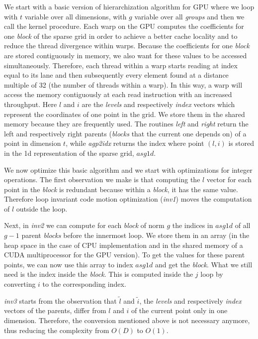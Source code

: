 We start with a basic version of hierarchization algorithm for GPU where we loop
with $t$ variable over all dimensions, with $g$ variable over all \textit{groups}
and then we call the kernel procedure. Each warp on the GPU computes the
coefficients for one \textit{block} of the sparse grid in order to achieve a
better cache locality and to reduce the thread divergence within warps. Because
the coefficients for one \textit{block} are stored contiguously in memory, we
also want for these values to be accessed simultaneously. Therefore, each thread
within a warp starts reading at index equal to its lane and then subsequently
every element found at a distance multiple of 32 (the number of threads within a
warp). In this way, a warp will access the memory contiguously at each read
instruction with an increased throughput. Here $l$ and $i$ are the
\textit{levels} and respectively \textit{index} vectors which represent the
coordinates of one point in the grid. We store them in the shared memory because
they are frequently used. The routines \textit{left} and \textit{right} return
the left and respectively right parents (\textit{blocks} that the current one
depends on) of a point in dimension $t$, while \textit{agp2idx} returns the
index where point $(l, i)$ is stored in the 1d representation of the sparse
grid, $asg1d$.

We now optimize this basic algorithm and we start with optimizations for integer
operations. The first observation we make is that computing the $l$ vector for
each point in the \textit{block} is redundant because within a \textit{block},
it has the same value. Therefore loop invariant code motion optimization
(\textit{inv1}) moves the computation of $l$ outside the loop. 

Next, in \textit{inv2} we can compute for each \textit{block} of norm $g$ the
indices in $asg1d$ of all $g-1$ parent \textit{blocks} before the innermost
loop. We store them in an array (in the heap space in the case of CPU
implementation and in the shared memory of a CUDA multiprocessor for the GPU
version). To get the values for these parent points, we can now use this array
to index $asg1d$ and get the \textit{block}. What we still need is the index
inside the \textit{block}. This is computed inside the $j$ loop by converting
$i$ to the corresponding index.

\textit{inv3} starts from the observation that $\tilde{l}$ and $\tilde{i}$, the
\textit{levels} and respectively \textit{index} vectors of the parents, differ
from $l$ and $i$ of the current point only in one dimension. Therefore, the
conversion mentioned above is not necessary anymore, thus reducing the
complexity from $O(D)$ to $O(1)$.

